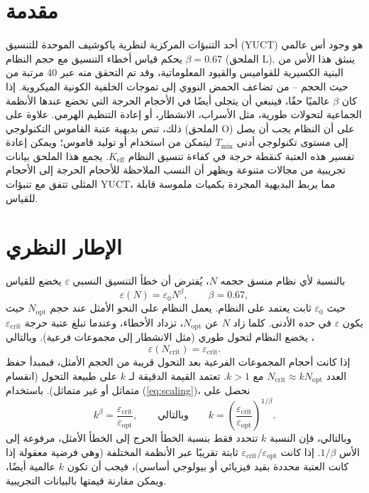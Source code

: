\documentclass[12pt]{article}
\theoremstyle{remark}
\newcommand{\Keff}{K_{\mathrm{eff}}}
\newcommand{\Tmin}{T_{\min}}
\begin{document}
	\tableofcontents
	\newpage
	
	\section{مقدمة}
	\label{sec:intro}
	
	أحد التنبؤات المركزية لنظرية ياكوشيف الموحدة للتنسيق (YUCT) هو وجود أس عالمي \(\beta = 0.67\) يحكم قياس أخطاء التنسيق مع حجم النظام (الملحق L). ينبثق هذا الأس من البنية الكسيرية للقواميس والقيود المعلوماتية، وقد تم التحقق منه عبر 40 مرتبة من حيث الحجم – من تضاعف الحمض النووي إلى تموجات الخلفية الكونية الميكروية. إذا كان \(\beta\) عالميًا حقًا، فينبغي أن يتجلى أيضًا في الأحجام الحرجة التي تخضع عندها الأنظمة الجماعية لتحولات طورية، مثل الأسراب، الانشطار، أو إعادة التنظيم الهرمي. علاوة على ذلك، تنص بديهية عتبة القاموس التكنولوجي (الملحق O) على أن النظام يجب أن يصل إلى مستوى تكنولوجي أدنى \(\Tmin\) ليتمكن من استخدام أو توليد قاموس؛ ويمكن إعادة تفسير هذه العتبة كنقطة حرجة في كفاءة تنسيق النظام \(\Keff\). يجمع هذا الملحق بيانات تجريبية من مجالات متنوعة ويظهر أن النسب الملاحظة للأحجام الحرجة إلى الأحجام المثلى تتفق مع تنبؤات YUCT، مما يربط البديهية المجردة بكميات ملموسة قابلة للقياس.
	
	\section{الإطار النظري}
	\label{sec:theory}
	
	بالنسبة لأي نظام منسق حجمه \(N\)، يُفترض أن خطأ التنسيق النسبي \(\varepsilon\) يخضع للقياس
	\begin{equation}
		\varepsilon(N) = \varepsilon_0 N^{\beta}, \qquad \beta = 0.67,
		\label{eq:scaling}
	\end{equation}
	حيث \(\varepsilon_0\) ثابت يعتمد على النظام. يعمل النظام على النحو الأمثل عند حجم \(N_{\text{opt}}\) حيث يكون \(\varepsilon\) في حده الأدنى. كلما زاد \(N\) عن \(N_{\text{opt}}\)، تزداد الأخطاء، وعندما تبلغ عتبة حرجة \(\varepsilon_{\text{crit}}\)، يخضع النظام لتحول طوري (مثل الانشطار إلى مجموعات فرعية). وبالتالي
	\begin{equation}
		\varepsilon(N_{\text{crit}}) = \varepsilon_{\text{crit}}.
	\end{equation}
	إذا كانت أحجام المجموعات الفرعية بعد التحول قريبة من الحجم الأمثل، فبمبدأ حفظ العدد \(N_{\text{crit}} \approx k N_{\text{opt}}\) مع \(k > 1\). تعتمد القيمة الدقيقة لـ \(k\) على طبيعة التحول (انقسام متماثل أو غير متماثل). باستخدام (\ref{eq:scaling})، نحصل على
	\begin{equation}
		k^{\beta} = \frac{\varepsilon_{\text{crit}}}{\varepsilon_{\text{opt}}}, 
		\qquad\text{وبالتالي}\qquad 
		k = \left( \frac{\varepsilon_{\text{crit}}}{\varepsilon_{\text{opt}}} \right)^{1/\beta}.
		\label{eq:k}
	\end{equation}
	وبالتالي، فإن النسبة \(k\) تتحدد فقط بنسبة الخطأ الحرج إلى الخطأ الأمثل، مرفوعة إلى الأس \(1/\beta\). إذا كانت \(\varepsilon_{\text{crit}}/\varepsilon_{\text{opt}}\) ثابتة تقريبًا عبر الأنظمة المختلفة (وهي فرضية معقولة إذا كانت العتبة محددة بقيد فيزيائي أو بيولوجي أساسي)، فيجب أن تكون \(k\) عالمية أيضًا، ويمكن مقارنة قيمتها بالبيانات التجريبية.
	
\end{document}
